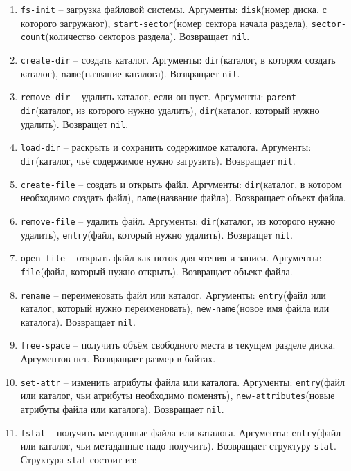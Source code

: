 \begin{enumerate}
	\begin{enumerate}
		\item \texttt{fs-init} -- загрузка файловой системы. Аргументы: \texttt{disk}(номер диска, с которого загружают), \texttt{start-sector}(номер сектора начала раздела), \texttt{sector-count}(количество секторов раздела). Возвращает \texttt{nil}.
		\item \texttt{create-dir} -- создать каталог. Аргументы: \texttt{dir}(каталог, в котором создать каталог), \texttt{name}(название каталога). Возвращает \texttt{nil}.
		\item \texttt{remove-dir} -- удалить каталог, если он пуст. Аргументы: \texttt{parent-dir}(каталог, из которого нужно удалить), \texttt{dir}(каталог, который нужно удалить). Возвращет \texttt{nil}.
		\item \texttt{load-dir} -- раскрыть и сохранить содержимое каталога. Аргументы: \texttt{dir}(каталог, чьё содержимое нужно загрузить). Возвращает \texttt{nil}.
		\item \texttt{create-file} -- создать и открыть файл. Аргументы: \texttt{dir}(каталог, в котором необходимо создать файл), \texttt{name}(название файла). Возвращает объект файла.
		\item \texttt{remove-file} -- удалить файл. Аргументы: \texttt{dir}(каталог, из которого нужно удалить), \texttt{entry}(файл, который нужно удалить). Возвращет \texttt{nil}.
		\item \texttt{open-file} -- открыть файл как поток для чтения и записи. Аргументы: \texttt{file}(файл, который нужно открыть). Возвращает объект файла.
		\item \texttt{rename} -- переименовать файл или каталог. Аргументы: \texttt{entry}(файл или каталог, который нужно переименовать), \texttt{new-name}(новое имя файла или каталога). Возвращает \texttt{nil}.
		\item \texttt{free-space} -- получить объём свободного места в текущем разделе диска. Аргументов нет. Возвращает размер в байтах.
		\item \texttt{set-attr} -- изменить атрибуты файла или каталога. Аргументы: \texttt{entry}(файл или каталог, чьи атрибуты необходимо поменять), \texttt{new-attributes}(новые атрибуты файла или каталога). Возвращает \texttt{nil}.
		\item \texttt{fstat} -- получить метаданные файла или каталога. Аргументы: \texttt{entry}(файл или каталог, чьи метаданные надо получить). Возвращает структуру \texttt{stat}. Структура \texttt{stat} состоит из:
		

\end{enumerate}
\end{enumerate}
